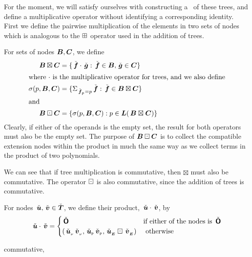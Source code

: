For the moment, we will satisfy ourselves with constructing a \rng\ of
these trees, and define a multiplicative operator without identifying a
corresponding identity. First we define the pairwise multiplication of
the elements in two sets of nodes which is analogous to the $\boxplus$
operator used in the addition of trees.
\begin{definition}\label{treesetmultiplication1} 
  For sets of nodes $\boldsymbol{B}, \boldsymbol{C}$, we define 
  \begin{align*}
    \boldsymbol{B}\boxtimes\boldsymbol{C}&=\{\,\check{\boldsymbol{f}}\cdot\,\check{\boldsymbol{g}}:\,\check{\boldsymbol{f}}\in\boldsymbol{B},\,\check{\boldsymbol{g}}\in\boldsymbol{C}\}\\
    \intertext{where $\cdot$ is the multiplicative operator for trees, and we also define}
    \sigma(p,\boldsymbol{B},\boldsymbol{C})&=\{\Sigma_{{\,\check{\boldsymbol{f}}}{{}_{_{\mathsf{P}}}}=p} \,\check{\boldsymbol{f}}:\,\check{\boldsymbol{f}}\in\boldsymbol{B}\boxtimes\boldsymbol{C}\}\\
      \intertext{and}
    \boldsymbol{B}\boxdot\boldsymbol{C}&=\{\sigma(p,\boldsymbol{B},\boldsymbol{C}): p\in\boldsymbol{L}(\,\boldsymbol{\boldsymbol{B}\boxtimes\boldsymbol{C}})\}
  \end{align*}
  Clearly, if either of the operands is the empty set, the result for
  both operators must also be the empty set.  The purpose of
  $\boldsymbol{B}\boxdot\boldsymbol{C}$ is to collect the compatible extension nodes
  within the product in much the same way as we collect terms in the
  product of two polynomials.

  We can see that if tree multiplication is commutative, then
  $\boxtimes$ must also be commutative. The operator $\boxdot$ is also
  commutative, since the addition of trees is commutative.
\end{definition}


\begin{definition}\label{treemultiplication} 
For nodes $\,\check{\boldsymbol{u}}, \,\check{\boldsymbol{v}} \in \check{\boldsymbol{T}}$, we define their product,
$\,\check{\boldsymbol{u}} \cdot \,\check{\boldsymbol{v}}$, by
\begin{equation}
  \,\check{\boldsymbol{u}} \cdot \,\check{\boldsymbol{v}} = \begin{cases}
    \,\check{\boldsymbol{\mathsf{O}}} & \text{if either of the nodes is } \,\check{\boldsymbol{\mathsf{O}}} \\
    ({\,\check{\boldsymbol{u}}}{{}_{_{\nu}}}{\,\check{\boldsymbol{v}}}{{}_{_{\nu}}}, {\,\check{\boldsymbol{u}}}{{}_{_{\mathsf{P}}}}{\,\check{\boldsymbol{v}}}{{}_{_{\mathsf{P}}}},{\,\check{\boldsymbol{u}}}{{}_{_{\boldsymbol{E}}}}\boxdot{\,\check{\boldsymbol{v}}}{{}_{_{\boldsymbol{E}}}}) & \text{ otherwise} \\
  \end{cases}
\end{equation}

commutative, 
\end{definition}

